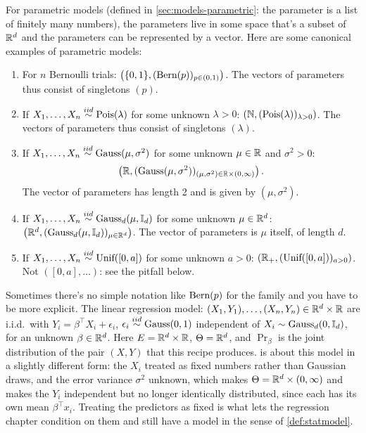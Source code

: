 For parametric models (defined in \cref{sec:models-parametric}: the parameter is a list of finitely many numbers), the parameters live in some space that's a subset of $\mathbb{R}^d$ and the parameters can be represented by a vector.
Here are some canonical examples of parametric models:
\begin{enumerate}
\item For $n$ Bernoulli trials: $\left( \{0, 1\}, (\text{Bern}(p))_{p \in (0,1)} \right)$.
The vectors of parameters thus consist of singletons $(p)$.

\item If $X_1, \ldots, X_n \stackrel{iid}{\sim} \text{Pois}(\lambda)$ for some unknown $\lambda > 0$: $\left( \mathbb{N}, (\text{Pois}(\lambda))_{\lambda > 0} \right)$.
The vectors of parameters thus consist of singletons $(\lambda)$.

\item If $X_1, \ldots, X_n \stackrel{iid}{\sim} \text{Gauss}(\mu, \sigma^2)$ for some unknown $\mu \in \mathbb{R}$ and $\sigma^2 > 0$:
\[
\left( \mathbb{R}, (\text{Gauss}(\mu, \sigma^2))_{(\mu, \sigma^2) \in \mathbb{R} \times (0, \infty)} \right).
\]
The vector of parameters has length 2 and is given by $(\mu, \sigma^2)$.

\item If $X_1, \ldots, X_n \stackrel{iid}{\sim} \text{Gauss}_d(\mu, \mathbb{I}_d)$ for some unknown $\mu \in \mathbb{R}^d$: $\left( \mathbb{R}^d, (\text{Gauss}_d(\mu, \mathbb{I}_d))_{\mu \in \mathbb{R}^d} \right)$.
The vector of parameters is $\mu$ itself, of length $d$.

\item If $X_1, \ldots, X_n \stackrel{iid}{\sim} \text{Unif}([0, a])$ for some unknown $a > 0$: $\left( \mathbb{R}_+, (\text{Unif}([0, a]))_{a > 0} \right)$.
Not $\left( [0, a], \ldots \right)$: see the pitfall below.
\end{enumerate}

Sometimes there's no simple notation like $\text{Bern}(p)$ for the family and you have to be more explicit.
The linear regression model: $(X_1, Y_1), \ldots, (X_n, Y_n) \in \mathbb{R}^d \times \mathbb{R}$ are i.i.d.\ with $Y_i = \beta^\top X_i + \epsilon_i$, $\epsilon_i \stackrel{iid}{\sim} \text{Gauss}(0,1)$ independent of $X_i \sim \text{Gauss}_d(0, \mathbb{I}_d)$, for an unknown $\beta \in \mathbb{R}^d$.
Here $E = \mathbb{R}^d \times \mathbb{R}$, $\Theta = \mathbb{R}^d$, and $\Pr_\beta$ is the joint distribution of the pair $(X, Y)$ that this recipe produces.
 is about this model in a slightly different form: the $X_i$ treated as fixed numbers rather than Gaussian draws, and the error variance $\sigma^2$ unknown, which makes $\Theta = \mathbb{R}^d \times (0, \infty)$ and makes the $Y_i$ independent but no longer identically distributed, since each has its own mean $\beta^\top x_i$.
Treating the predictors as fixed is what lets the regression chapter condition on them and still have a model in the sense of \cref{def:statmodel}.

